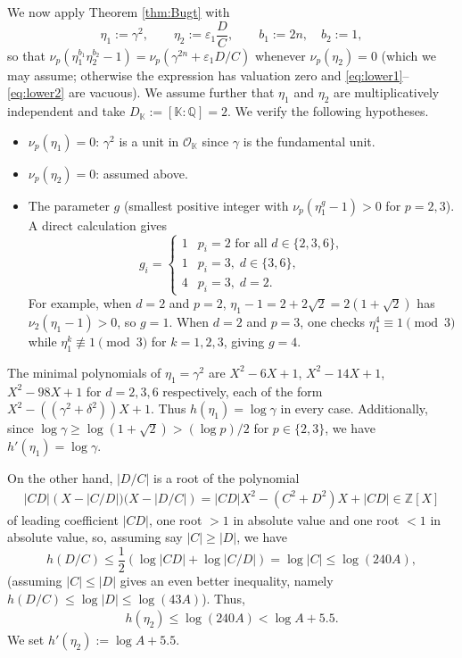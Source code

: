 \documentclass[11pt,a4paper]{article}
\numberwithin{equation}{section}
\numberwithin{table}{section}
\numberwithin{figure}{section}
\begin{document}
\medskip

We now apply Theorem \ref{thm:Bugt} with
\begin{equation*}
	\eta_1 := \gamma^2,\qquad
	\eta_2 := \varepsilon_1\frac{D}{C},\qquad
	b_1 := 2n,\quad b_2 := 1,
\end{equation*}
so that $\nu_{p}(\eta_1^{b_1}\eta_2^{b_2}-1) =
\nu_{p}(\gamma^{2n}+\varepsilon_1 D/C)$ whenever $\nu_{p}(\eta_2)=0$ (which we may assume; otherwise the expression has valuation zero and \eqref{eq:lower1}--\eqref{eq:lower2} are vacuous). We assume further that $\eta_{1}$ and $\eta_2$ are multiplicatively independent and take
$D_{\mathbb K} := [\mathbb{K}:\mathbb{Q}] = 2$. We verify the following hypotheses.
\begin{itemize}
	\item $\nu_{p}(\eta_1)=0$: $\gamma^2$ is a unit in
	$\mathcal{O}_{\mathbb{K}}$ since $\gamma$ is the fundamental unit.
	\item $\nu_{p}(\eta_2)=0$: assumed above.
	\item The parameter $g$ (smallest positive integer with
	$\nu_{p}(\eta_1^{g}-1)>0$ for $p=2,3$). A direct calculation gives
	\begin{equation}\label{eq:g-vals}
		g_i = \begin{cases}
			1 & p_i=2 \text{ for all } d\in\{2,3,6\},\\
			1 & p_i=3,\; d\in\{3,6\},\\
			4 & p_i=3,\; d=2.
		\end{cases}
	\end{equation}
For example, when $d=2$ and $p=2$, $\eta_1-1 = 2+2\sqrt{2} = 2(1+\sqrt{2})$ has $\nu_2(\eta_1-1)>0$, so $g=1$. When $d=2$ and $p=3$, one checks $\eta_1^4 \equiv 1\pmod{3}$ while $\eta_1^k\not\equiv 1\pmod{3}$ for $k=1,2,3$, giving $g=4$.
\end{itemize}

\medskip

The minimal polynomials of $\eta_1=\gamma^2$ are $X^2-6X+1$, $X^2-14X+1$, $X^2-98X+1$ for $d=2,3,6$ respectively, each of the form $X^2-((\gamma^2+\delta^2))X+1$. Thus $h(\eta_1) = \log\gamma$ in every case. Additionally, since $\log\gamma \geq \log(1+\sqrt{2}) > (\log p)/2$ for $p\in\{2,3\}$, we have $h'(\eta_1) = \log\gamma$.

On the other hand, $|D/C|$ is a root of the polynomial 
\begin{align*}
	|CD|\left(X-|C/D|)(X-|D/C|\right)
	=  |CD| X^2-(C^2+D^2)X+|CD|\in {\mathbb Z}[X]
\end{align*}
of leading coefficient $|CD|$, one root $>1$ in absolute value and one root $<1$ in absolute value, so, assuming say $|C|\ge |D|$, we have
$$h(D/C) \leq
\frac{1}{2}(\log|CD|+\log|C/D|) = \log|C| \leq \log(240A),$$ (assuming
$|C|\leq|D|$ gives an even better inequality, namely $h(D/C)\le \log |D|\le \log(43A)$). Thus,
\begin{align*}
	h(\eta_2) \leq \log(240A) < \log A + 5.5.
\end{align*}
We set $h'(\eta_2) := \log A + 5.5$.
\end{document}
